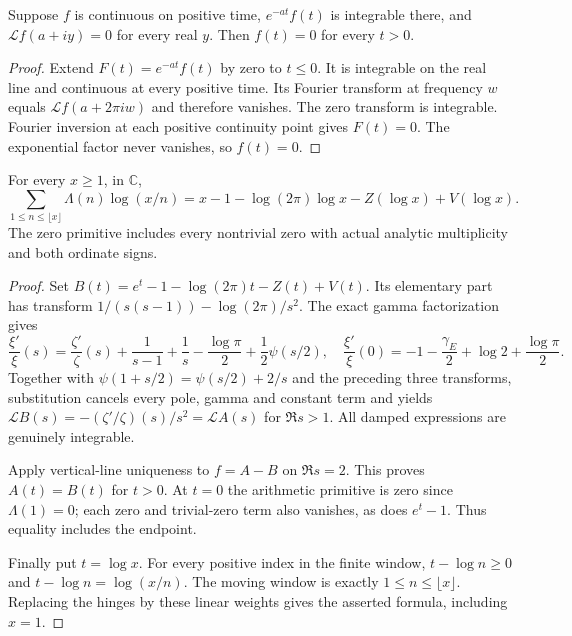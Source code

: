 \begin{lemma}
\label{analytic:laplace-uniqueness}
\leanok
Suppose $f$ is continuous on positive time,
$e^{-at}f(t)$ is integrable there, and
$\mathcal Lf(a+iy)=0$ for every real $y$.
Then $f(t)=0$ for every $t>0$.
\end{lemma}
\begin{proof}
Extend $F(t)=e^{-at}f(t)$ by zero to $t\le0$.
It is integrable on the real line and continuous at every positive
time.  Its Fourier transform at frequency $w$ equals
$\mathcal Lf(a+2\pi iw)$ and therefore vanishes.
The zero transform is integrable.
Fourier inversion at each positive continuity point gives $F(t)=0$.
The exponential factor never vanishes, so $f(t)=0$.
\end{proof}

\begin{theorem}
\label{analytic:smoothed-explicit-formula}
\leanok
For every $x\ge1$, in $\mathbb C$,
\[
 \sum_{1\le n\le\lfloor x\rfloor}\Lambda(n)\log(x/n)
 =x-1-\log(2\pi)\log x-Z(\log x)+V(\log x).
\]
The zero primitive includes every nontrivial zero with actual
analytic multiplicity and both ordinate signs.
\end{theorem}
\begin{proof}
Set
$B(t)=e^t-1-\log(2\pi)t-Z(t)+V(t)$.
Its elementary part has transform
$1/(s(s-1))-\log(2\pi)/s^2$.
The exact gamma factorization gives
\[
 \frac{\xi'}{\xi}(s)=\frac{\zeta'}{\zeta}(s)
 +\frac1{s-1}+\frac1s-\frac{\log\pi}{2}
 +\frac12\psi(s/2),
\quad
 \frac{\xi'}{\xi}(0)=
 -1-\frac{\gamma_E}{2}+\log2+\frac{\log\pi}{2}.
\]
Together with $\psi(1+s/2)=\psi(s/2)+2/s$ and the preceding
three transforms, substitution cancels every pole, gamma and
constant term and yields
$\mathcal LB(s)=-(\zeta'/\zeta)(s)/s^2=\mathcal LA(s)$
for $\Re s>1$.
All damped expressions are genuinely integrable.

Apply vertical-line uniqueness to $f=A-B$ on $\Re s=2$.
This proves $A(t)=B(t)$ for $t>0$.
At $t=0$ the arithmetic primitive is zero since $\Lambda(1)=0$;
each zero and trivial-zero term also vanishes, as does $e^t-1$.
Thus equality includes the endpoint.

Finally put $t=\log x$.
For every positive index in the finite window,
$t-\log n\ge0$ and
$t-\log n=\log(x/n)$.
The moving window is exactly $1\le n\le\lfloor x\rfloor$.
Replacing the hinges by these linear weights gives the asserted
formula, including $x=1$.
\end{proof}


